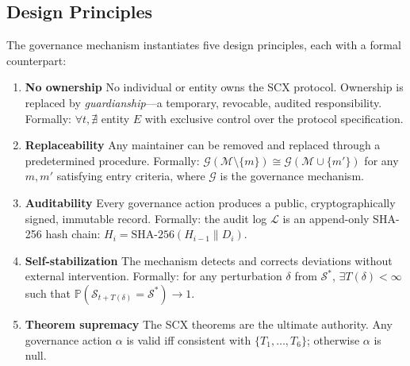 \documentclass[12pt,a4paper]{article}
\theoremstyle{definition}
\newcommand{\MaintainerSet}{\mathcal{M}}
\newcommand{\ProtocolState}{\mathcal{S}}
\newcommand{\Pbb}{\mathbb{P}}
\begin{document}
\subsection{Design Principles}
The governance mechanism instantiates five design principles, each with a formal counterpart:
\begin{enumerate}[label=\textbf{P\arabic*},leftmargin=*]
    \item \textbf{No ownership} No individual or entity owns the SCX protocol. Ownership is replaced by \textit{guardianship}---a temporary, revocable, audited responsibility. Formally: $\forall t, \nexists$ entity $E$ with exclusive control over the protocol specification.
    \item \textbf{Replaceability} Any maintainer can be removed and replaced through a predetermined procedure. Formally: $\mathcal{G}(\MaintainerSet \setminus \{m\}) \cong \mathcal{G}(\MaintainerSet \cup \{m'\})$ for any $m, m'$ satisfying entry criteria, where $\mathcal{G}$ is the governance mechanism.
    \item \textbf{Auditability} Every governance action produces a public, cryptographically signed, immutable record. Formally: the audit log $\mathcal{L}$ is an append-only SHA-256 hash chain: $H_i = \text{SHA-256}(H_{i-1} \| D_i)$.
    \item \textbf{Self-stabilization} The mechanism detects and corrects deviations without external intervention. Formally: for any perturbation $\delta$ from $\ProtocolState^*$, $\exists T(\delta) < \infty$ such that $\Pbb(\ProtocolState_{t+T(\delta)} = \ProtocolState^*) \to 1$.
    \item \textbf{Theorem supremacy} The SCX theorems are the ultimate authority. Any governance action $\alpha$ is valid iff consistent with $\{T_1, \ldots, T_6\}$; otherwise $\alpha$ is null.
\end{enumerate}
\end{document}
